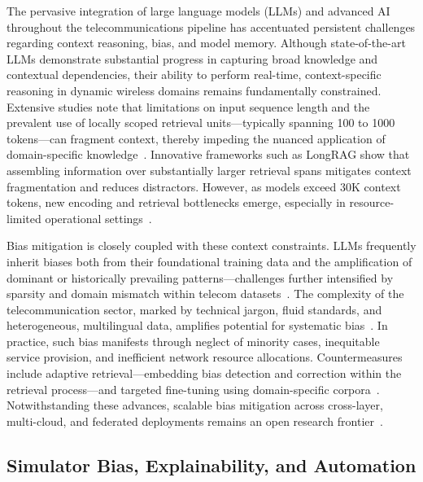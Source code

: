 The pervasive integration of large language models (LLMs) and advanced AI throughout the telecommunications pipeline has accentuated persistent challenges regarding context reasoning, bias, and model memory. Although state-of-the-art LLMs demonstrate substantial progress in capturing broad knowledge and contextual dependencies, their ability to perform real-time, context-specific reasoning in dynamic wireless domains remains fundamentally constrained. Extensive studies note that limitations on input sequence length and the prevalent use of locally scoped retrieval units—typically spanning 100 to 1000 tokens—can fragment context, thereby impeding the nuanced application of domain-specific knowledge~\cite{ref7,ref9,ref16,ref20,ref21,ref22,ref28,ref37}. Innovative frameworks such as LongRAG show that assembling information over substantially larger retrieval spans mitigates context fragmentation and reduces distractors. However, as models exceed 30K context tokens, new encoding and retrieval bottlenecks emerge, especially in resource-limited operational settings~\cite{ref37}.

Bias mitigation is closely coupled with these context constraints. LLMs frequently inherit biases both from their foundational training data and the amplification of dominant or historically prevailing patterns—challenges further intensified by sparsity and domain mismatch within telecom datasets~\cite{ref7,ref9,ref21}. The complexity of the telecommunication sector, marked by technical jargon, fluid standards, and heterogeneous, multilingual data, amplifies potential for systematic bias~\cite{ref7,ref22,ref26}. In practice, such bias manifests through neglect of minority cases, inequitable service provision, and inefficient network resource allocations. Countermeasures include adaptive retrieval—embedding bias detection and correction within the retrieval process—and targeted fine-tuning using domain-specific corpora~\cite{ref20,ref28}. Notwithstanding these advances, scalable bias mitigation across cross-layer, multi-cloud, and federated deployments remains an open research frontier~\cite{ref16,ref26,ref37}.

\subsection{Simulator Bias, Explainability, and Automation}

